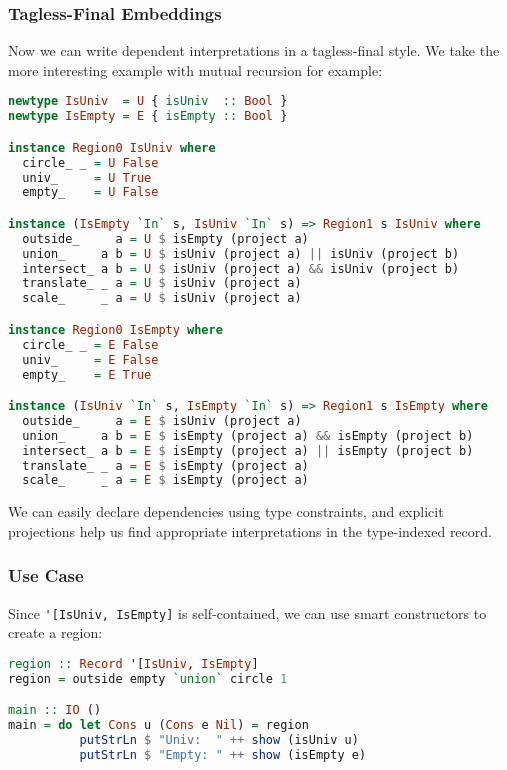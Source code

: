 \subsubsection{Tagless-Final Embeddings}

Now we can write dependent interpretations in a tagless-final style. We
take the more interesting example with mutual recursion for example:

\begin{lstlisting}[language=Haskell]
newtype IsUniv  = U { isUniv  :: Bool }
newtype IsEmpty = E { isEmpty :: Bool }

instance Region0 IsUniv where
  circle_ _ = U False
  univ_     = U True
  empty_    = U False

instance (IsEmpty `In` s, IsUniv `In` s) => Region1 s IsUniv where
  outside_     a = U $ isEmpty (project a)
  union_     a b = U $ isUniv (project a) || isUniv (project b)
  intersect_ a b = U $ isUniv (project a) && isUniv (project b)
  translate_ _ a = U $ isUniv (project a)
  scale_     _ a = U $ isUniv (project a)

instance Region0 IsEmpty where
  circle_ _ = E False
  univ_     = E False
  empty_    = E True

instance (IsUniv `In` s, IsEmpty `In` s) => Region1 s IsEmpty where
  outside_     a = E $ isUniv (project a)
  union_     a b = E $ isEmpty (project a) && isEmpty (project b)
  intersect_ a b = E $ isEmpty (project a) || isEmpty (project b)
  translate_ _ a = E $ isEmpty (project a)
  scale_     _ a = E $ isEmpty (project a)
\end{lstlisting}
\noindent
We can easily declare dependencies using type constraints, and
explicit projections help us find appropriate interpretations
in the type-indexed record.

\subsubsection{Use Case}

Since \lstinline!'[IsUniv, IsEmpty]! is self-contained,
we can use smart constructors to create a region:

\begin{lstlisting}[language=Haskell,deletekeywords={union,intersect}]
region :: Record '[IsUniv, IsEmpty]
region = outside empty `union` circle 1

main :: IO ()
main = do let Cons u (Cons e Nil) = region
          putStrLn $ "Univ:  " ++ show (isUniv u)
          putStrLn $ "Empty: " ++ show (isEmpty e)
\end{lstlisting}
